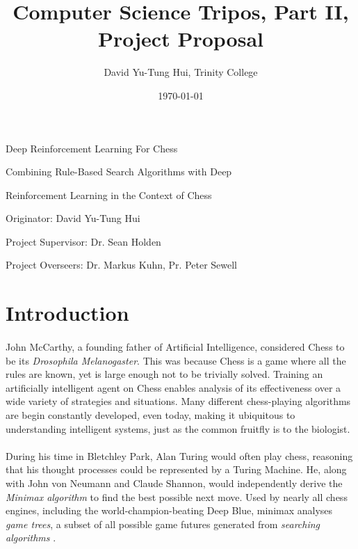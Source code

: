 \documentclass[a4paper]{article}
\title{Computer Science Tripos, Part II, Project Proposal}
\author{David Yu-Tung Hui, Trinity College}
\date{\today}
\begin{document}
\maketitle

\centerline{\huge Deep Reinforcement Learning For Chess}
\vspace{0.2in}
\centerline{\large Combining Rule-Based Search Algorithms with Deep}
\vspace{0.05in}
\centerline{\large Reinforcement Learning in the Context of Chess}
\vspace{0.45in}
\centerline{\large Originator: David Yu-Tung Hui}
\vspace{0.05in}
\centerline{\large Project Supervisor: Dr. Sean Holden}
\vspace{0.05in}
\centerline{\large Project Overseers: Dr. Markus Kuhn, Pr. Peter Sewell}


\section*{Introduction}

\paragraph{}John McCarthy, a founding father of Artificial Intelligence, considered Chess to be its \textit{Drosophila Melanogaster}. \cite{drosophila} This was because Chess is a game where all the rules are known, yet is large enough not to be trivially solved. Training an artificially intelligent agent on Chess enables analysis of its effectiveness over a wide variety of strategies and situations. Many different chess-playing algorithms are begin constantly developed, even today, making it ubiquitous to understanding intelligent systems, just as the common fruitfly is to the biologist.

\paragraph{}During his time in Bletchley Park, Alan Turing would often play chess, reasoning that his thought processes could be represented by a Turing Machine. \cite{michieIntel} He, along with John von Neumann and Claude Shannon, would independently derive the \textit{Minimax algorithm} to find the best possible next move. \cite{giraffe} \cite{michieIntel} Used by nearly all chess engines, including the world-champion-beating Deep Blue, minimax analyses \textit{game trees}, a subset of all possible game futures generated from \textit{searching algorithms} \cite{deepBlue}.
\end{document}
